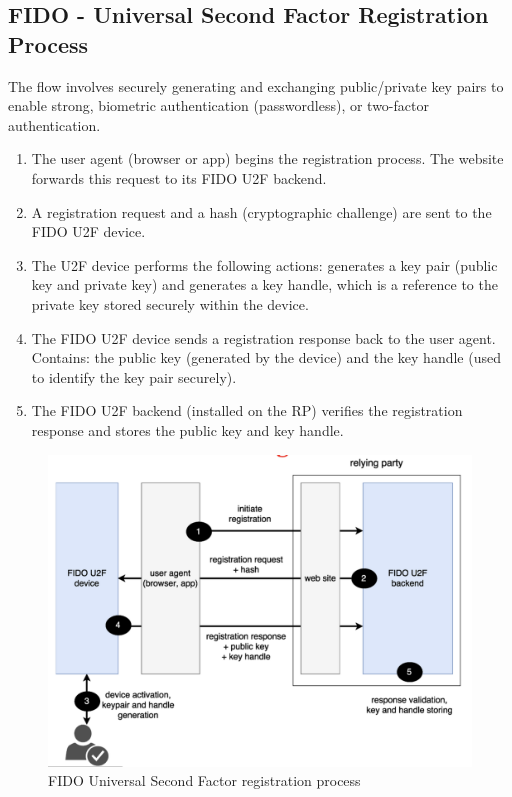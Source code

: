 \subsection*{FIDO - Universal Second Factor Registration Process}
The flow involves securely generating and exchanging public/private key pairs to enable strong, biometric authentication (passwordless), or two-factor authentication.
\begin{multicols}{2}

    \begin{enumerate}
        \item The user agent (browser or app) begins the registration process. The website forwards this request to its FIDO U2F backend.
        \item A registration request and a hash (cryptographic challenge) are sent to the FIDO U2F device.
        \item The U2F device performs the following actions: generates a key pair (public key and private key) and generates a key handle, which is a reference to the private key stored securely within the device.
        \item The FIDO U2F device sends a registration response back to the user agent. Contains: the public key (generated by the device) and the key handle (used to identify the key pair securely).
        \item The FIDO U2F backend (installed on the RP) verifies the registration response and stores the public key and key handle.
    \end{enumerate}
\columnbreak

    \begin{figure}[H]
        \centering
        \includegraphics[width=\linewidth]{Images/Authentication/fidoreg.png}
        \caption{FIDO Universal Second Factor registration process}
    \end{figure}
\end{multicols}

